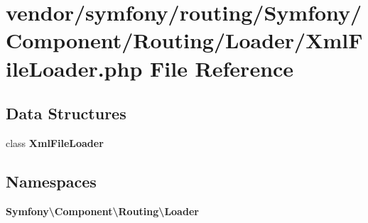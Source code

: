 \section{vendor/symfony/routing/\+Symfony/\+Component/\+Routing/\+Loader/\+Xml\+File\+Loader.php File Reference}
\label{_xml_file_loader_8php}
\subsection*{Data Structures}
\begin{DoxyCompactItemize}
\item 
class {\bf Xml\+File\+Loader}
\end{DoxyCompactItemize}
\subsection*{Namespaces}
\begin{DoxyCompactItemize}
\item 
 {\bf Symfony\textbackslash{}\+Component\textbackslash{}\+Routing\textbackslash{}\+Loader}
\end{DoxyCompactItemize}
